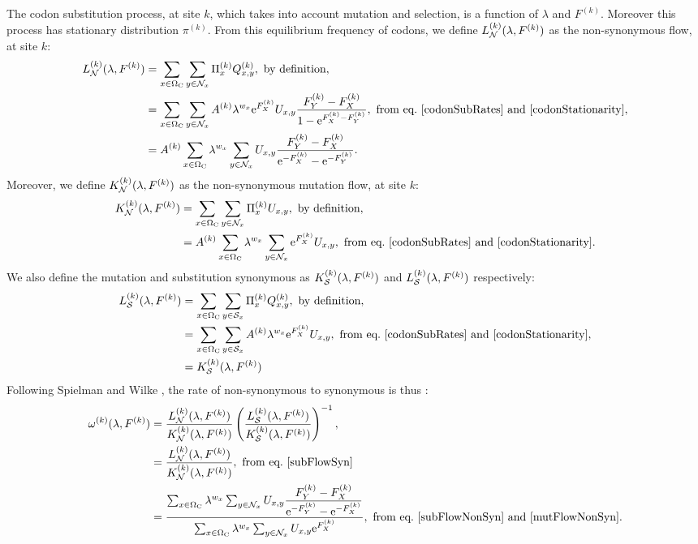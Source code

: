 The \gls{codon} \gls{substitution} process, at site $k$, which takes into account mutation and selection, is a function of $\lambda$ and $F^{(k)}$.
Moreover this process has stationary distribution $\pi^{(k)}$.
From this equilibrium frequency of \glspl{codon}, we define $L_{\mathcal{N}}^{(k)}(\lambda, F^{(k)})$ as the \gls{non-synonymous} flow, at site $k$:
\begin{align}
L_{\NonSyn}^{(k)}(\lambda, F^{(k)})
& =  \sum_{x \in \SetCodon} \sum_{y \in \NxNonSyn} \Pi_x^{(k)} Q_{x, y}^{(k)}, \ \textrm{by definition},\\
& =\sum_{x \in \SetCodon} \sum_{y \in \NxNonSyn} A^{(k)} \lambda^{w_x} \e^{F_X^{(k)}} U_{x, y} \dfrac{F_Y^{(k)} - F_X^{(k)}}{1 - \e^{F_X^{(k)} - F_Y^{(k)}}}, \ \textrm{from eq.}\ \ref{codonSubRates} \ \text{and} \ \ref{codonStationarity},\\
& =A^{(k)} \sum_{x \in \SetCodon} \lambda^{w_x} \sum_{y \in \NxNonSyn}  U_{x, y} \dfrac{F_Y^{(k)} - F_X^{(k)}}{\e^{-F_X^{(k)}} - \e^{ - F_Y^{(k)}}}.
\label{subFlowNonSyn}
\end{align}
Moreover, we define $K_{\mathcal{N}}^{(k)}(\lambda, F^{(k)})$ as the non-synonymous mutation flow, at site $k$:
\begin{align}
K_{\NonSyn}^{(k)}(\lambda, F^{(k)})
& =  \sum_{x \in \SetCodon} \sum_{y \in \NxNonSyn} \Pi_x^{(k)} U_{x, y}, \ \textrm{by definition},\\
& = A^{(k)}  \sum_{x \in \SetCodon} \lambda^{w_x} \sum_{y \in \NxNonSyn} \e^{F_X^{(k)}} U_{x, y}, \ \textrm{from eq.}\ \ref{codonSubRates} \ \text{and} \ \ref{codonStationarity}.
\label{mutFlowNonSyn}
\end{align}
We also define the mutation and \gls{substitution} synonymous as $K_{\mathcal{S}}^{(k)}(\lambda, F^{(k)})$ and $L_{\mathcal{S}}^{(k)}(\lambda, F^{(k)})$ respectively:
\begin{align}
L_{\Syn}^{(k)}(\lambda, F^{(k)})
& =  \sum_{x \in \SetCodon} \sum_{y \in \NxSyn} \Pi_x^{(k)} Q_{x, y}^{(k)}, \ \textrm{by definition},\\
& =\sum_{x \in \SetCodon} \sum_{y \in \NxSyn} A^{(k)} \lambda^{w_x} \e^{F_X^{(k)}} U_{x, y}, \ \textrm{from eq.}\ \ref{codonSubRates} \ \text{and} \ \ref{codonStationarity}, \\
& =K_{\Syn}^{(k)}(\lambda, F^{(k)})
\label{subFlowSyn}
\end{align}
Following Spielman and Wilke \citep{Spielman2015}, the rate of non-synonymous to \gls{synonymous} is thus :
\begin{align}
\omega^{(k)}(\lambda, F^{(k)})
& =\dfrac{L_{\NonSyn}^{(k)}(\lambda, F^{(k)})}{K_{\NonSyn}^{(k)}(\lambda, F^{(k)})}  \left( \dfrac{L_{\Syn}^{(k)}(\lambda, F^{(k)})}{K_{\Syn}^{(k)}(\lambda, F^{(k)})}  \right)^{-1}, \\
& =\dfrac{L_{\NonSyn}^{(k)}(\lambda, F^{(k)})}{K_{\NonSyn}^{(k)}(\lambda, F^{(k)})}, \ \textrm{from eq.}\ \ref{subFlowSyn} \\
& =\dfrac{ \sum_{x \in \SetCodon} \lambda^{w_x} \sum_{y \in \NxNonSyn}  U_{x, y} \dfrac{F_Y^{(k)} - F_X^{(k)}}{\e^{ - F_Y^{(k)}} -  \e^{- F_X^{(k)}} } }{ \sum_{x \in \SetCodon}  \lambda^{w_x} \sum_{y \in \NxNonSyn} U_{x, y} \e^{F_X^{(k)}} }, \ \textrm{from eq.}\ \ref{subFlowNonSyn} \ \text{and} \ \ref{mutFlowNonSyn}.
\label{omegaSite}
\end{align}
